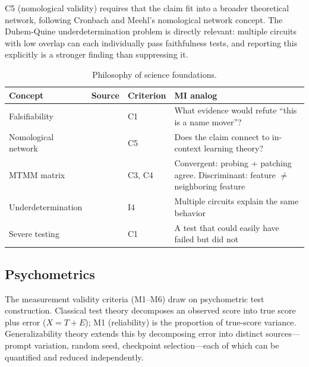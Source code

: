 \documentclass[10pt]{article}
\begin{document}
C5 (nomological validity) requires that the claim fit into a broader theoretical network, following Cronbach and Meehl's nomological network concept. The Duhem-Quine underdetermination problem is directly relevant: multiple circuits with low overlap can each individually pass faithfulness tests, and reporting this explicitly is a stronger finding than suppressing it.

\begin{table}[H]
\centering\small
\caption{Philosophy of science foundations.}
\renewcommand{\arraystretch}{1.12}
\begin{tabular}{@{}l>{\raggedright\arraybackslash}p{2cm}l>{\raggedright\arraybackslash}p{4.5cm}@{}}
\toprule
\textbf{Concept} & \textbf{Source} & \textbf{Criterion} & \textbf{MI analog} \\
\midrule
Falsifiability & \citet{popper1959logic} & C1 & What evidence would refute ``this is a name mover''? \\
\midrule
Nomological network & \citet{cronbach1955construct} & C5 & Does the claim connect to in-context learning theory? \\
\midrule
MTMM matrix & \citet{campbell1959convergent} & C3, C4 & Convergent: probing + patching agree. Discriminant: feature $\neq$ neighboring feature \\
\midrule
Underdetermination & \citet{duhem1906theorie} & I4 & Multiple circuits explain the same behavior \\
\midrule
Severe testing & \citet{mayo2018statistical} & C1 & A test that could easily have failed but did not \\
\bottomrule
\end{tabular}
\end{table}

\subsection{Psychometrics}
\label{sec:psychometrics}

The measurement validity criteria (M1--M6) draw on psychometric test construction. Classical test theory decomposes an observed score into true score plus error ($X = T + E$); M1 (reliability) is the proportion of true-score variance. Generalizability theory extends this by decomposing error into distinct sources---prompt variation, random seed, checkpoint selection---each of which can be quantified and reduced independently.
\end{document}
